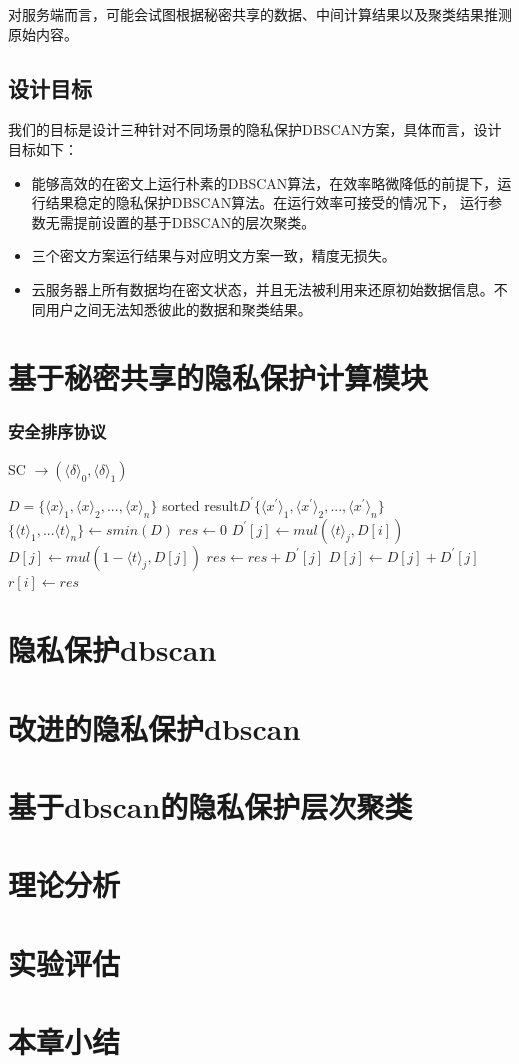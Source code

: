 对服务端而言，可能会试图根据秘密共享的数据、中间计算结果以及聚类结果推测原始内容。
\subsection{设计目标}
我们的目标是设计三种针对不同场景的隐私保护DBSCAN方案，具体而言，设计目标如下：

\begin{itemize}
	\item 能够高效的在密文上运行朴素的DBSCAN算法，在效率略微降低的前提下，运行结果稳定的隐私保护DBSCAN算法。在运行效率可接受的情况下， 运行参数无需提前设置的基于DBSCAN的层次聚类。
	\item 三个密文方案运行结果与对应明文方案一致，精度无损失。
	\item 云服务器上所有数据均在密文状态，并且无法被利用来还原初始数据信息。不同用户之间无法知悉彼此的数据和聚类结果。
\end{itemize}
\section{基于秘密共享的隐私保护计算模块}
\label{s4-subpro}
\subsubsection{安全排序协议}
\begin{algorithm}[htbp]
	\renewcommand{\algorithmicrequire}{\textbf{输入:}}
	\renewcommand{\algorithmicensure}{\textbf{输出:}}
	\caption{SC $\rightarrow (\langle \delta \rangle_0, \langle \delta \rangle_1)$}
	\label{alg_sort}
	\begin{algorithmic}[1]
		\REQUIRE $ D = \{\langle x\rangle_1, \langle x\rangle_2,...,\langle x\rangle_n\} $
		\ENSURE sorted result$ D^{\prime}\{\langle x^{\prime}\rangle_1, \langle x^{\prime}\rangle_2,...,\langle x^{\prime}\rangle_n\} $
		\STATE $ \{\langle t\rangle_1,...\langle t \rangle_n\} \leftarrow smin(D)$
		\STATE $ res \leftarrow 0 $
		\STATE $ D^{\prime}[j] \leftarrow  mul(\langle t \rangle_j, D[i])$
		\STATE $ D[j] \leftarrow mul(1-\langle t \rangle_j, D[j]) $
		\STATE $ res \leftarrow res + D^{\prime}[j] $
		\STATE $ D[j] \leftarrow D[j] + D^{\prime}[j] $
		\ENDFOR
		\STATE $ r[i] \leftarrow res $
		\ENDFOR
	\end{algorithmic}
\end{algorithm}
\section{隐私保护dbscan}
\label{s4-t1}
\section{改进的隐私保护dbscan}
\label{s4-t2}
\section{基于dbscan的隐私保护层次聚类}
\label{s4-t3}
\section{理论分析}
\label{s4-lilun}
\section{实验评估}
\label{s4-shiyan}
\section{本章小结}
\label{s4-xiaojie}